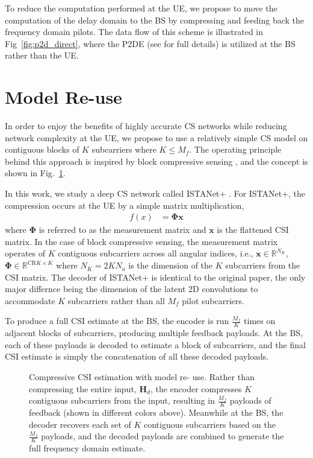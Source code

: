 To reduce the computation performed at the UE, we propose to move the computation of 
the delay domain to the BS by compressing and feeding back the frequency domain pilots.
The data flow of this scheme is illustrated in Fig~\ref{fig:p2d_direct}, where the 
P2DE (see \cite{ref:delRosario2022p2d} for full details) is utilized at the 
BS rather than the UE.

\section{Model Re-use} \label{sect:model_reuse}

In order to enjoy the benefits of highly accurate CS networks while
reducing network complexity at the UE, we propose to use a relatively simple CS
model on contiguous blocks of $K$ subcarriers where $K \leq M_f$.
The operating principle behind this approach is inspired by block 
compressive sensing \cite{ref:Gan2007blockCS}, and the concept is 
shown in Fig.~\ref{fig:model_reuse}.

In this work, we study a deep CS network called ISTANet+ \cite{ref:zhang2018ista}.
For ISTANet+, the compression occurs at the UE by a simple matrix multiplication, 
\begin{align}
    f(x) &= \mathbf{\Phi}\mathbf{x}
\end{align}
where $\mathbf{\Phi}$ is referred to as the measurement matrix and 
$\mathbf{x}$ is the flattened CSI matrix. In the case of block compressive
sensing, the measurement matrix operates of $K$ contiguous subcarriers across
all angular indices, i.e., $\mathbf{x} \in \mathbb{R}^{N_K}$, $\mathbf{\Phi} 
\in \mathbb{R}^{\text{CR} K  \times K}$ where $N_K = 2 K N_a$ is the dimension of
the $K$ subcarriers from the CSI matrix. The decoder of ISTANet+ is identical 
to the original paper, the only major differnce being the dimension of the latent
2D convolutions to accommodate $K$ subcarriers rather than all $M_f$ pilot subcarriers.

To produce a full CSI estimate at the BS, the encoder is run $\frac{M_f}{K}$ times
on adjacent blocks of subcarriers, producing multiple feedback payloads. At the BS, 
each of these payloads is decoded to estimate a block of subcarriers, and the final CSI
estimate is simply the concatenation of all these decoded payloads.

\begin{figure}
    \centering
    {
      \fontsize{8pt}{8pt}
      \def\svgwidth{1.0\linewidth}
      
    }
    \caption{Compressive CSI estimation with model re-
    use. Rather than compressing the entire input, $\mathbf{H}_d$,
    the encoder compresses $K$ contiguous subcarriers
    from the input, resulting in $\frac{M_f}{K}$ payloads of feedback
    (shown in different colors above). Meanwhile at the
    BS, the decoder recovers each set of $K$ contiguous
    subcarriers based on the $\frac{M_f}{K}$ payloads, and the
    decoded payloads are combined to generate the full
    frequency domain estimate.}
    \label{fig:model_reuse}
\end{figure}

